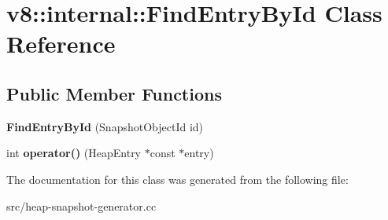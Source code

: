 \hypertarget{classv8_1_1internal_1_1_find_entry_by_id}{}\section{v8\+:\+:internal\+:\+:Find\+Entry\+By\+Id Class Reference}
\label{classv8_1_1internal_1_1_find_entry_by_id}
\subsection*{Public Member Functions}
\begin{DoxyCompactItemize}
\item 
\hypertarget{classv8_1_1internal_1_1_find_entry_by_id_ac6a391bb6eb3d715857eed651ddc43d8}{}{\bfseries Find\+Entry\+By\+Id} (Snapshot\+Object\+Id id)\label{classv8_1_1internal_1_1_find_entry_by_id_ac6a391bb6eb3d715857eed651ddc43d8}

\item 
\hypertarget{classv8_1_1internal_1_1_find_entry_by_id_a341a173ff06bf66fd71c0fa5c1c80be3}{}int {\bfseries operator()} (Heap\+Entry $\ast$const $\ast$entry)\label{classv8_1_1internal_1_1_find_entry_by_id_a341a173ff06bf66fd71c0fa5c1c80be3}

\end{DoxyCompactItemize}


The documentation for this class was generated from the following file\+:\begin{DoxyCompactItemize}
\item 
src/heap-\/snapshot-\/generator.\+cc\end{DoxyCompactItemize}
